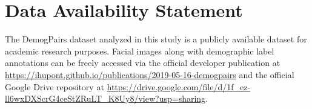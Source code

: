 \section*{Data Availability Statement}
The DemogPairs dataset analyzed in this study is a publicly available dataset for academic research purposes. Facial images along with demographic label annotations can be freely accessed via the official developer publication at \url{https://ihupont.github.io/publications/2019-05-16-demogpairs} and the official Google Drive repository at \url{https://drive.google.com/file/d/1f_ez-ll6wxDXScrG4ceStZRuLT_K8Uy8/view?usp=sharing}.
